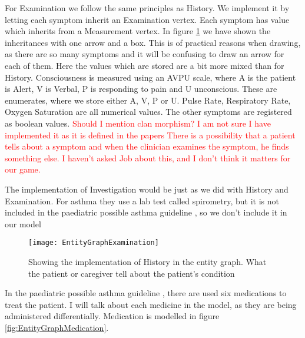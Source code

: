 For Examination we follow the same principles as History. We implement it by letting each symptom inherit an Examination vertex. Each symptom has value which inherits from a Measurement vertex. In figure \ref{fig:EntityGraphExamination} we have shown the inheritances with one arrow and a box. This is of practical reasons when drawing, as there are so many symptoms and it will be confusing to draw an arrow for each of them. Here the values which are stored are a bit more mixed than for History. Consciousness is measured using an AVPU scale, where A is the patient is Alert, V is Verbal, P is responding to pain and U unconscious. These are enumerates, where we store either A, V, P or U. Pulse Rate, Respiratory Rate, Oxygen Saturation are all numerical values. The other symptoms are registered as boolean values.
\textcolor{red}{Should I mention clan morphism? I am not sure I have implemented it as it is defined in the papers}
\textcolor{red}{There is a possibility that a patient tells about a symptom and when the clinician examines the symptom, he finds something else. I haven't asked Job about this, and I don't think it matters for our game.}

The implementation of Investigation would be just as we did with History and Examination. For asthma they use a lab test called spirometry, but it is not included in the paediatric possible asthma guideline \cite{RepublicofKeny2016}, so we don't include it in our model

\begin{figure}[h!]
	\caption {Showing the implementation of History in the entity graph. What the patient or caregiver tell about the patient's condition}
	\label{fig:EntityGraphExamination}
	\texttt{[image: EntityGraphExamination]}
\end{figure}

In the paediatric possible asthma guideline \cite{RepublicofKeny2016}, there are used six medications to treat the patient. I will talk about each medicine in the model, as they are being administered differentially. Medication is modelled in figure \ref{fig:EntityGraphMedication}.



